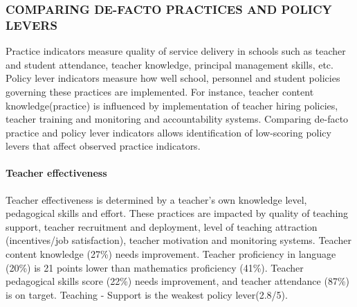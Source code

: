 \documentclass[twocolumn]{article}
\let\oldparagraph\paragraph
\renewcommand{\paragraph}[1]{\oldparagraph{#1}\mbox{}}
\begin{document}
\hypertarget{comparing-de-facto-practices-and-policy-levers}{%
\subsubsection{\texorpdfstring{\textbf{COMPARING DE-FACTO PRACTICES AND
POLICY
LEVERS}}{COMPARING DE-FACTO PRACTICES AND POLICY LEVERS}}\label{comparing-de-facto-practices-and-policy-levers}}

Practice indicators measure quality of service delivery in schools such
as teacher and student attendance, teacher knowledge, principal
management skills, etc. Policy lever indicators measure how well school,
personnel and student policies governing these practices are
implemented. For instance, teacher content knowledge(practice) is
influenced by implementation of teacher hiring policies, teacher
training and monitoring and accountability systems. Comparing de-facto
practice and policy lever indicators allows identification of
low-scoring policy levers that affect observed practice indicators.

\hypertarget{teacher-effectiveness}{%
\paragraph{\texorpdfstring{\textbf{Teacher
effectiveness}}{Teacher effectiveness}}\label{teacher-effectiveness}}

Teacher effectiveness is determined by a teacher's own knowledge level,
pedagogical skills and effort. These practices are impacted by quality
of teaching support, teacher recruitment and deployment, level of
teaching attraction (incentives/job satisfaction), teacher motivation
and monitoring systems. Teacher content knowledge (27\%) needs
improvement. Teacher proficiency in language (20\%) is 21 points lower
than mathematics proficiency (41\%). Teacher pedagogical skills score
(22\%) needs improvement, and teacher attendance (87\%) is on target.
Teaching - Support is the weakest policy lever(2.8/5).
\end{document}
